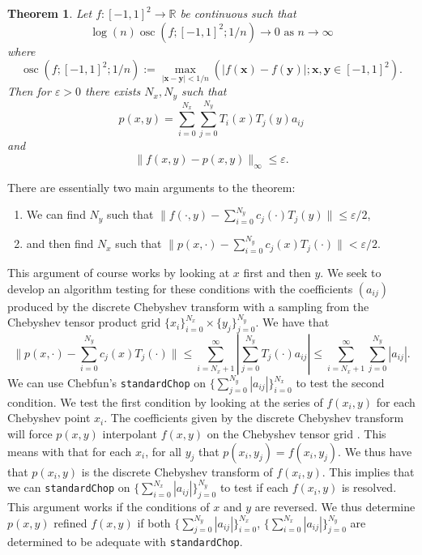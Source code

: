 \documentclass{article}
\DeclareMathOperator*{\osc}{osc}
\newtheorem{theorem}{Theorem}[section]
\newcommand{\R}{\mathbb{R}}
\newcommand{\vect}[1]{\mathbf{#1}}
\begin{document}
\begin{theorem} 
Let $f:[-1,1]^2 \to \R$ be continuous such that
$$
\log(n)\osc(f;[-1,1]^2;1/n)\to 0 \text{ as } n\to \infty
$$
where
$$
\osc(f;[-1,1]^2;1/n):=\max_{|{\vect{x}-\vect{y}}|<1/n}(|f(\vect{x})-f(\vect{y})|;\vect{x},\vect{y} \in [-1,1]^2).
$$
Then for $\varepsilon>0$ there exists $N_x,N_y$ such that
$$
p(x,y) = \sum_{i=0}^{N_x} \sum_{j=0}^{N_y} T_i(x)T_j(y)a_{ij}
$$
and
$$
\|f(x,y)-p(x,y)\|_{\infty} \leq \varepsilon.
$$
 \end{theorem}
There are essentially two main arguments to the theorem:
\begin{enumerate}
\item We can find $N_y$ such that $\|f(\cdot,y) -\sum_{i=0}^{N_y} c_j(\cdot)T_j(y) \| \leq \varepsilon/2$,
\item and then find $N_x$ such that $\|p(x,\cdot) - \sum_{i=0}^{N_y} c_j(x)T_j(\cdot)\|<\varepsilon/2$.
\end{enumerate}
This argument of course works by looking at $x$ first and then $y$. We seek to develop an algorithm testing for these conditions with the coefficients $(a_{ij})$ produced by the discrete Chebyshev transform with a sampling from the Chebyshev tensor product grid $\{x_i\}_{i=0}^{N_x} \times \{y_j\}_{j=0}^{N_y}$. We have that
\begin{equation}
\|p(x,\cdot) - \sum_{i=0}^{N_y} c_j(x)T_j(\cdot)\| \leq \sum_{i=N_x+1}^{\infty} | \sum_{j=0}^{N_y} T_j(\cdot) a_{ij}	 | \leq \sum_{i=N_x+1}^{\infty} \sum_{j=0}^{N_y} |a_{ij}|.
\end{equation}
We can use Chebfun's {\tt standardChop} on $\{\sum_{j=0}^{N_y} |a_{ij}|\}_{i=0}^{N_x}$ to test the second condition. We test the first condition by looking at the series of $f(x_i,y)$ for each Chebyshev point $x_i$. The coefficients given by the discrete Chebyshev transform will force $p(x,y)$ interpolant $f(x,y)$ on the Chebyshev tensor grid \cite{mason2002chebyshev}. This means with that for each $x_i$, for all $y_j$ that $p(x_i,y_j) = f(x_i,y_j)$. We thus have that $p(x_i,y)$ is the discrete Chebyshev transform of $f(x_i,y)$. This implies that we can {\tt standardChop} on $\{\sum_{i=0}^{N_x} |a_{ij}|\}_{j=0}^{N_y}$ to test if each $f(x_i,y)$ is resolved. This argument works if the conditions of $x$ and $y$ are reversed. We thus determine $p(x,y)$ refined $f(x,y)$ if both $\{\sum_{j=0}^{N_y} |a_{ij}|\}_{i=0}^{N_x}$, $\{\sum_{i=0}^{N_x} |a_{ij}|\}_{j=0}^{N_y}$ are determined to be adequate with {\tt standardChop}.
\end{document}
